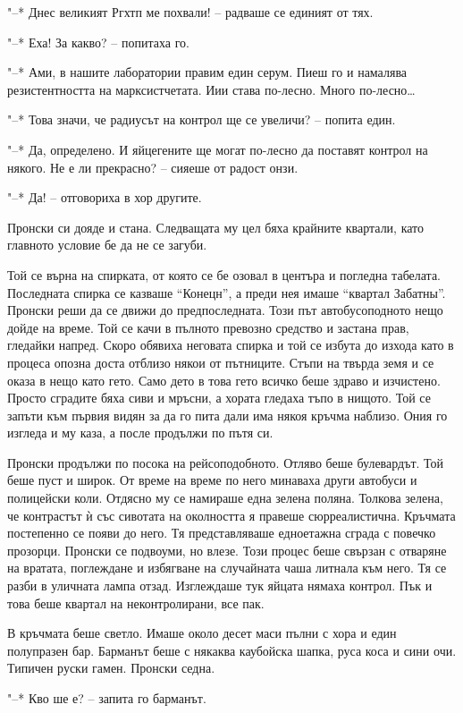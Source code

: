 \documentclass[ebook,openany,12pt]{memoir}
\begin{document}
"--* Днес великият Ргхтп ме похвали! – радваше се единият от тях.

"--* Еха! За какво? – попитаха го.

"--* Ами, в нашите лаборатории правим един серум. Пиеш го и намалява резистентността на марксистчетата. Иии става по-лесно. Много по-лесно\ldots

"--* Това значи, че радиусът на контрол ще се увеличи? – попита един.

"--* Да, определено. И яйцегените ще могат по-лесно да поставят контрол на някого. Не е ли прекрасно? – сияеше от радост онзи.

"--* Да! – отговориха в хор другите.

Пронски си дояде и стана. Следващата му цел бяха крайните квартали, като главното условие бе да не се загуби.

Той се върна на спирката, от която се бе озовал в центъра и погледна табелата. Последната спирка се казваше ``Конецн'', а преди нея имаше ``квартал Забатны''. Пронски реши да се движи до предпоследната. Този път автобусоподното нещо дойде на време. Той се качи в пълното превозно средство и застана прав, гледайки напред. Скоро обявиха неговата спирка и той се избута до изхода като в процеса опозна доста отблизо някои от пътниците. Стъпи на твърда земя и се оказа в нещо като гето. Само дето в това гето всичко беше здраво и изчистено. Просто сградите бяха сиви и мръсни, а хората гледаха тъпо в нищото. Той се запъти към първия видян за да го пита дали има някоя кръчма наблизо. Ония го изгледа и му каза, а после продължи по пътя си.

Пронски продължи по посока на рейсоподобното. Отляво беше булевардът. Той беше пуст и широк. От време на време по него минаваха други автобуси и полицейски коли. Отдясно му се намираше една зелена поляна. Толкова зелена, че контрастът ѝ със сивотата на околността я правеше сюрреалистична. Кръчмата постепенно се появи до него. Тя представляваше едноетажна сграда с повечко прозорци. Пронски се подвоуми, но влезе. Този процес беше свързан с отваряне на вратата, поглеждане и избягване на случайната чаша литнала към него. Тя се разби в уличната лампа отзад. Изглеждаше тук яйцата нямаха контрол. Пък и това беше квартал на неконтролирани, все пак.

В кръчмата беше светло. Имаше около десет маси пълни с хора и един полупразен бар. Барманът беше с някаква каубойска шапка, руса коса и сини очи. Типичен руски гамен. Пронски седна.

"--* Кво ше е? – запита го барманът.
\end{document}
